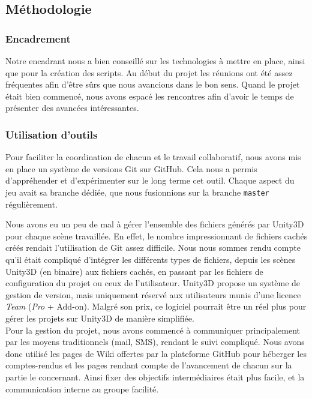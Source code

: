 \documentclass[a4paper,11pt]{article}
\begin{document}
\subsection{Méthodologie}
\subsubsection{Encadrement}
Notre encadrant nous a bien conseillé sur les technologies à mettre en place, ainsi que pour la création des scripts. Au début du projet les réunions ont été assez fréquentes afin d'être sûrs que nous avancions dans le bon sens. Quand le projet était bien commencé, nous avons espacé les rencontres afin d'avoir le temps de présenter des avancées intéressantes. 

\subsubsection{Utilisation d'outils}
Pour faciliter la coordination de chacun et le travail collaboratif, nous avons mis en place un système de versions Git sur GitHub. Cela nous a permis d'appréhender et d'expérimenter sur le long terme cet outil. Chaque aspect du jeu avait sa branche dédiée, que nous fusionnions sur la branche \texttt{master} régulièrement. 

Nous avons eu un peu de mal à gérer l'ensemble des fichiers générés par Unity3D pour chaque scène travaillée. En effet, le nombre impressionnant de fichiers cachés créés rendait l'utilisation de Git assez difficile. Nous nous sommes rendu compte qu'il était compliqué d'intégrer les différents types de fichiers, depuis les scènes Unity3D (en binaire) aux fichiers cachés, en passant par les fichiers de configuration du projet ou ceux de l'utilisateur. Unity3D propose un système de gestion de version, mais uniquement réservé aux utilisateurs munis d'une licence \textit{Team} (\textit{Pro} + Add-on). Malgré son prix, ce logiciel pourrait être un réel plus pour gérer les projets sur Unity3D de manière simplifiée. \\


Pour la gestion du projet, nous avons commencé à communiquer principalement par les moyens traditionnels (mail, SMS), rendant le suivi compliqué. Nous avons donc utilisé les pages de Wiki offertes par la plateforme GitHub pour héberger les comptes-rendus et les pages rendant compte de l'avancement de chacun sur la partie le concernant. Ainsi fixer  des objectifs intermédiaires était plus facile, et la communication interne au groupe facilité.  
\end{document}
